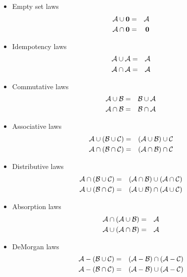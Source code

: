 \documentclass[justified, sixbynine]{tufte-book}
\theoremstyle{plain}%
\newtheorem * {corollary}{Corollary}
\theoremstyle{definition}
\theoremstyle{remark}
\newtheorem * {remark}{Remark}
\newtheorem * {note}{Note}
\begin{document}
\begin{fullwidth}
\begin{itemize}
\item  Empty set laws
\begin{eqnarray}
{\cal A}\cup {\bf 0} &=&{\cal A} \\
{\cal A}\cap {\bf 0} &=&{\bf 0}
\end{eqnarray}

\item  Idempotency laws
\begin{eqnarray}
{\cal A}\cup {\cal A} &=&{\cal A} \\
{\cal A}\cap {\cal A} &=&{\cal A}
\end{eqnarray}

\item  Commutative laws
\begin{eqnarray}
{\cal A}\cup {\cal B} &=&{\cal B}\cup {\cal A} \\
{\cal A}\cap {\cal B} &=&{\cal B}\cap {\cal A}
\end{eqnarray}

\item  Associative laws
\begin{eqnarray}
{\cal A}\cup ({\cal B}\cup {\cal C}) &=&({\cal A}\cup {\cal B})\cup {\cal C}
\\
{\cal A}\cap ({\cal B\cap C}) &=&({\cal A\cap B})\cap {\cal C}
\end{eqnarray}

\item  Distributive laws
\begin{eqnarray}
{\cal A}\cap ({\cal B}\cup {\cal C}) &=&({\cal A}\cap {\cal B})\cup ({\cal A}%
\cap {\cal C}) \\
{\cal A}\cup ({\cal B}\cap {\cal C}) &=&({\cal A}\cup {\cal B})\cap ({\cal A}%
\cup {\cal C})
\end{eqnarray}

\item  Absorption laws
\begin{eqnarray}
{\cal A}\cap ({\cal A}\cup {\cal B}) &=&{\cal A} \\
{\cal A}\cup ({\cal A}\cap {\cal B}) &=&{\cal A}
\end{eqnarray}

\item  DeMorgan laws
\begin{eqnarray}
{\cal A}-({\cal B}\cup {\cal C}) &=&({\cal A}-{\cal B})\cap ({\cal A}-{\cal C%
}) \\
{\cal A}-({\cal B}\cap {\cal C}) &=&({\cal A}-{\cal B})\cup ({\cal A}-{\cal C%
})
\end{eqnarray}
\end{itemize}


\end{fullwidth}
\end{document}
